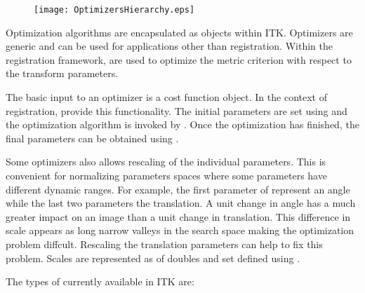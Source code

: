 


\begin{figure}
\center
\texttt{[image: OptimizersHierarchy.eps]}
\label{fig:OptimizersHierarchy}
\end{figure}

Optimization algorithms are encapsulated as  objects
within ITK. Optimizers are generic and can be used for applications other than
registration.  Within the registration framework,
 are used to optimize the metric
criterion with respect to the transform parameters.


The basic input to an optimizer is a cost function object. In the context
of registration,  provide this functionality.
The initial parameters are set using  and
the optimization algorithm is invoked by .
Once the optimization has finished, the final parameters can be obtained
using .

Some optimizers also allows rescaling of the individual parameters. This
is convenient for normalizing parameters spaces where some parameters
have different dynamic ranges. For example, the first parameter of
 represent an angle while the last two parameters
the translation. A unit change in angle has a much greater impact on
an image than a unit change in translation. This difference in scale appears
as long narrow valleys in the search space making the optimization problem
diffcult. Rescaling the translation parameters can help to fix this problem.
Scales are represented as  of doubles and set defined using
.

The types of  currently available
in ITK are:



